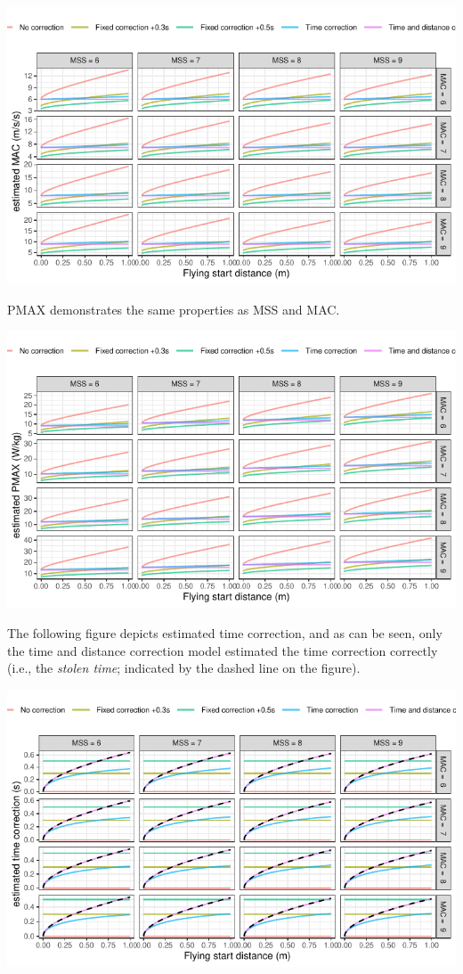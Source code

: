 \documentclass[fleqn,10pt,lineno]{wlpeerj} %
\begin{document}
\begin{center}\includegraphics[width=0.9\linewidth]{paper_files/figure-latex/unnamed-chunk-38-1} \end{center}

PMAX demonstrates the same properties as MSS and MAC.

\begin{center}\includegraphics[width=0.9\linewidth]{paper_files/figure-latex/unnamed-chunk-39-1} \end{center}

The following figure depicts estimated time correction, and as can be seen, only the time and distance correction model estimated the time correction correctly (i.e., the \emph{stolen time}; indicated by the dashed line on the figure).

\begin{center}\includegraphics[width=0.9\linewidth]{paper_files/figure-latex/unnamed-chunk-40-1} \end{center}
\end{document}
